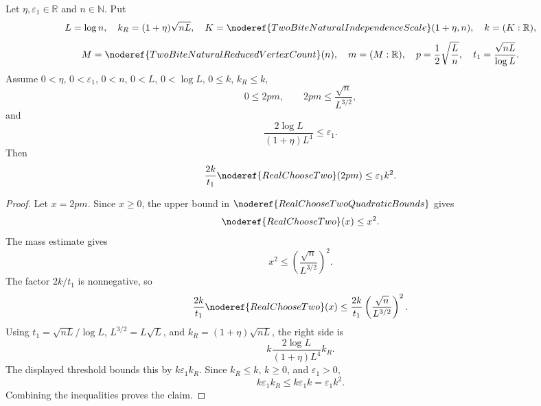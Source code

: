 \begin{helper}
Let \(\eta,\varepsilon_1\in\mathbb R\) and \(n\in\mathbb N\).  Put
\[
L=\log n,\quad
k_R=(1+\eta)\sqrt{nL},\quad
K=\noderef{TwoBiteNaturalIndependenceScale}(1+\eta,n),\quad k=(K:\mathbb R),
\]
\[
M=\noderef{TwoBiteNaturalReducedVertexCount}(n),\quad m=(M:\mathbb R),
\quad
p=\frac12\sqrt{\frac Ln},\quad
t_1=\frac{\sqrt{nL}}{\log L}.
\]
Assume \(0<\eta\), \(0<\varepsilon_1\), \(0<n\), \(0<L\), \(0<\log L\),
\(0\le k\), \(k_R\le k\),
\[
0\le 2pm,\qquad
2pm\le\frac{\sqrt n}{L^{3/2}},
\]
and
\[
\frac{2\log L}{(1+\eta)L^4}\le\varepsilon_1.
\]
Then
\[
\frac{2k}{t_1}\noderef{RealChooseTwo}(2pm)\le\varepsilon_1k^2.
\]
\end{helper}
\begin{proof}
Let \(x=2pm\).  Since \(x\ge0\), the upper bound in
\(\noderef{RealChooseTwoQuadraticBounds}\) gives
\[
\noderef{RealChooseTwo}(x)\le x^2.
\]
The mass estimate gives
\[
x^2\le \left(\frac{\sqrt n}{L^{3/2}}\right)^2.
\]
The factor \(2k/t_1\) is nonnegative, so
\[
\frac{2k}{t_1}\noderef{RealChooseTwo}(x)
\le
\frac{2k}{t_1}\left(\frac{\sqrt n}{L^{3/2}}\right)^2.
\]
Using \(t_1=\sqrt{nL}/\log L\), \(L^{3/2}=L\sqrt L\), and
\(k_R=(1+\eta)\sqrt{nL}\), the right side is
\[
k\frac{2\log L}{(1+\eta)L^4}k_R.
\]
The displayed threshold bounds this by \(k\varepsilon_1 k_R\).  Since
\(k_R\le k\), \(k\ge0\), and \(\varepsilon_1>0\),
\[
k\varepsilon_1 k_R\le k\varepsilon_1 k=\varepsilon_1 k^2.
\]
Combining the inequalities proves the claim.
\end{proof}
